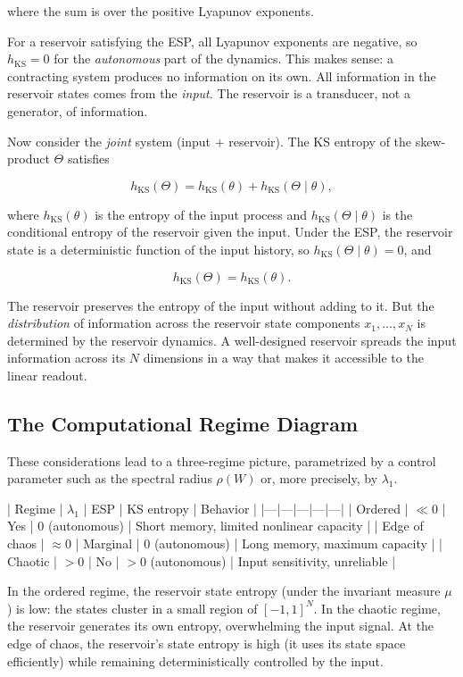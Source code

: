 where the sum is over the positive Lyapunov exponents.

For a reservoir satisfying the ESP, all Lyapunov exponents are negative, so $h_{\text{KS}} = 0$ for the \textit{autonomous} part of the dynamics. This makes sense: a contracting system produces no information on its own. All information in the reservoir states comes from the \textit{input}. The reservoir is a transducer, not a generator, of information.

Now consider the \textit{joint} system (input + reservoir). The KS entropy of the skew-product $\Theta$ satisfies

\[
h_{\text{KS}}(\Theta) = h_{\text{KS}}(\theta) + h_{\text{KS}}(\Theta \mid \theta),
\]

where $h_{\text{KS}}(\theta)$ is the entropy of the input process and $h_{\text{KS}}(\Theta \mid \theta)$ is the conditional entropy of the reservoir given the input. Under the ESP, the reservoir state is a deterministic function of the input history, so $h_{\text{KS}}(\Theta \mid \theta) = 0$, and

\[
h_{\text{KS}}(\Theta) = h_{\text{KS}}(\theta).
\]

The reservoir preserves the entropy of the input without adding to it. But the \textit{distribution} of information across the reservoir state components $x_1, \ldots, x_N$ is determined by the reservoir dynamics. A well-designed reservoir spreads the input information across its $N$ dimensions in a way that makes it accessible to the linear readout.

\subsection{The Computational Regime Diagram}\label{sec:16.4.3}

These considerations lead to a three-regime picture, parametrized by a control parameter such as the spectral radius $\rho(W)$ or, more precisely, by $\lambda_1$.

| Regime | $\lambda_1$ | ESP | KS entropy | Behavior |
|---|---|---|---|---|
| Ordered | $\ll 0$ | Yes | $0$ (autonomous) | Short memory, limited nonlinear capacity |
| Edge of chaos | $\approx 0$ | Marginal | $0$ (autonomous) | Long memory, maximum capacity |
| Chaotic | $> 0$ | No | $> 0$ (autonomous) | Input sensitivity, unreliable |

In the ordered regime, the reservoir state entropy (under the invariant measure $\mu$) is low: the states cluster in a small region of $[-1,1]^N$. In the chaotic regime, the reservoir generates its own entropy, overwhelming the input signal. At the edge of chaos, the reservoir's state entropy is high (it uses its state space efficiently) while remaining deterministically controlled by the input.

